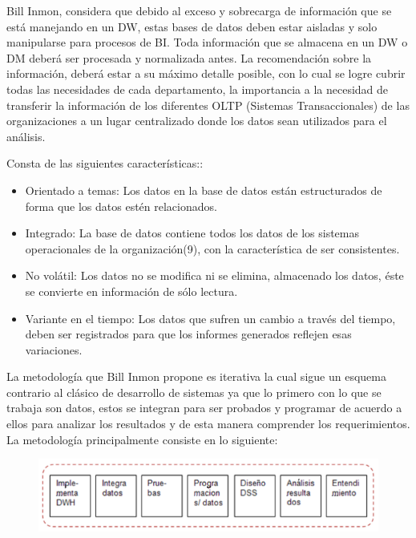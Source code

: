 \documentclass[preprint,12pt]{elsarticle}
\begin{document}
Bill Inmon, considera que debido al exceso y sobrecarga de información que se está manejando en un DW, estas bases de datos deben estar aisladas y solo manipularse para procesos de BI. Toda información que se almacena en un DW o DM deberá ser
procesada y normalizada antes. La recomendación sobre la información, deberá estar a su máximo detalle posible, con lo cual se logre cubrir todas las necesidades de cada departamento, la importancia a la necesidad de transferir la información de los diferentes OLTP (Sistemas Transaccionales) de las organizaciones a un lugar centralizado donde los datos sean utilizados para el análisis.

Consta de las siguientes características::
\begin{itemize}
		\item Orientado a temas: Los datos en la base de datos están estructurados de forma que los datos estén relacionados.
		\item Integrado: La base de datos contiene todos los datos de los sistemas operacionales de la organización(9), con la característica de ser consistentes.
		\item No volátil: Los datos no se modifica ni se elimina, almacenado los datos, éste se convierte en información de sólo lectura.
		\item Variante en el tiempo: Los datos que sufren un cambio a través del tiempo, deben ser registrados para que los informes generados reflejen esas variaciones.
\end{itemize}

La metodología que Bill Inmon propone es iterativa la cual sigue un esquema contrario al clásico de desarrollo de sistemas ya que lo primero con lo que se trabaja son datos, estos se
integran para ser probados y programar de acuerdo a ellos para analizar los resultados y de esta manera comprender los requerimientos. La metodología principalmente consiste en lo
siguiente:
\begin{figure}[htb]
				\begin{center}
					\includegraphics[width=15cm]{./IMAGENES/imgmire1}
				\end{center}
			\end{figure}
\end{document}
